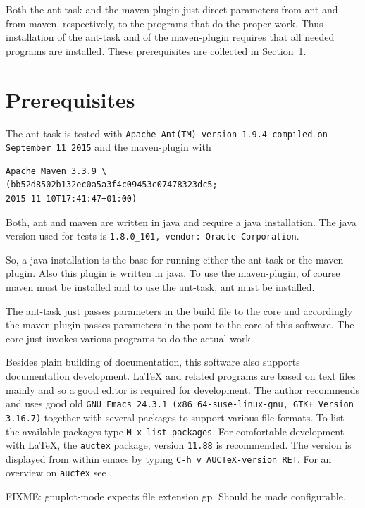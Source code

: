 \documentclass[12pt]{book}
\renewcommand{\index}[1]{ }
\begin{document}
Both the ant-task and the maven-plugin just direct parameters 
from ant and from maven, respectively, 
to the programs that do the proper work. 
Thus installation of the ant-task and of the maven-plugin 
requires that all needed programs are installed. 
These prerequisites are collected in Section~\ref{sec:prerequisites}. 
\index{ant-task}

\section{Prerequisites}\label{sec:prerequisites}

The ant-task is tested with 
\texttt{Apache Ant(TM) version 1.9.4 compiled on September 11 2015}\index{ant}
and the maven-plugin with 
%
\index{maven}
\begin{verbatim}
Apache Maven 3.3.9 \
(bb52d8502b132ec0a5a3f4c09453c07478323dc5; 
2015-11-10T17:41:47+01:00)
\end{verbatim}
%
Both, ant and maven are written in java and require a java installation. 
The java\index{java} version used for tests 
is \texttt{1.8.0\_101, vendor: Oracle Corporation}. 


So, a java installation is the base for running either the ant-task 
or the maven-plugin. 
Also this plugin is written in java. 
To use the maven-plugin, of course maven must be installed 
and to use the ant-task, ant must be installed. 

The ant-task just passes parameters in the build file to the core 
and accordingly the maven-plugin passes parameters in the pom 
to the core of this software. 
The core just invokes various programs to do the actual work. 
\index{ant-task}

Besides plain building of documentation, 
this software also supports documentation development. 
\LaTeX{} and related programs are based on text files mainly 
and so a good editor is required for development. 
The author recommends and uses good old 
\texttt{GNU Emacs 24.3.1 (x86\_64-suse-linux-gnu, GTK+ Version 3.16.7)} 
together with several packages to support 
various file formats. 
To list the available packages type 
\texttt{M-x list-packages}. 
For comfortable development with \LaTeX, 
the \texttt{auctex} package, version \texttt{11.88} is recommended. 
The version is displayed from within emacs 
by typing \texttt{C-h v AUCTeX-version RET}. 
For an overview on \texttt{auctex} see \cite{AucTeX}. 


FIXME: gnuplot-mode expects file extension gp. 
Should be made configurable. 
\end{document}
